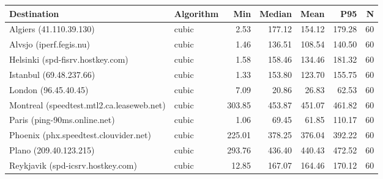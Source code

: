\begin{tabular}{llrrrrr}
\hline
Destination & Algorithm & Min & Median & Mean & P95 & N \\
\hline
Algiers (41.110.39.130) & cubic & 2.53 & 177.12 & 154.12 & 179.28 & 60 \\
Alvsjo (iperf.fegis.nu) & cubic & 1.46 & 136.51 & 108.54 & 140.50 & 60 \\
Helsinki (spd-fisrv.hostkey.com) & cubic & 1.58 & 158.46 & 134.46 & 181.32 & 60 \\
Istanbul (69.48.237.66) & cubic & 1.33 & 153.80 & 123.70 & 155.75 & 60 \\
London (96.45.40.45) & cubic & 7.09 & 20.86 & 26.83 & 62.53 & 60 \\
Montreal (speedtest.mtl2.ca.leaseweb.net) & cubic & 303.85 & 453.87 & 451.07 & 461.82 & 60 \\
Paris (ping-90ms.online.net) & cubic & 1.06 & 69.45 & 61.85 & 110.17 & 60 \\
Phoenix (phx.speedtest.clouvider.net) & cubic & 225.01 & 378.25 & 376.04 & 392.22 & 60 \\
Plano (209.40.123.215) & cubic & 293.76 & 436.40 & 440.43 & 472.52 & 60 \\
Reykjavik (spd-icsrv.hostkey.com) & cubic & 12.85 & 167.07 & 164.46 & 170.12 & 60 \\
\hline
\end{tabular}
